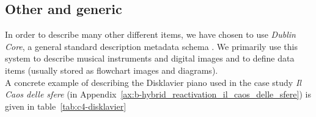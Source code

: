 \begin{longtable}{|p{}|p{}|p{}|}
\end{longtable}

\subsection{Other and generic}
In order to describe many other different items, we have chosen to use \textit{Dublin Core}, a general standard description metadata schema \cite{DublinCore}. We primarily use this system to describe musical instruments and digital images and to define data items (usually stored as flowchart images and diagrams).\\
A concrete example of describing the Disklavier piano used in the case study \textit{Il Caos delle sfere} (in Appendix~\ref{ax:b-hybrid_reactivation_il_caos_delle_sfere}) is given in table~\ref{tab:c4-disklavier}

